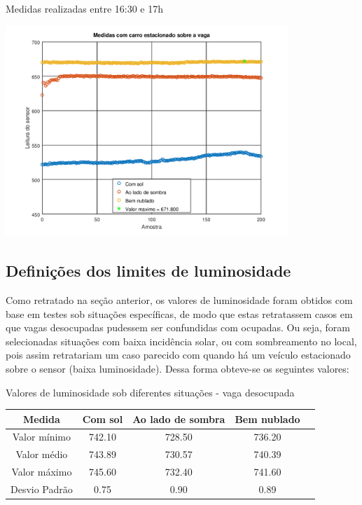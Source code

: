 \documentclass[oneside,openright,12pt]{ufsm_2015} %
\begin{document}
\begin{enumerate}
        \begin{grafico}[ht]
         	    \caption{\label{exepretex1}Medidas realizadas entre 16:30 e 17h}
    	    \centering
    	    \includegraphics[width=0.8\textwidth]{figuras/carros_tarde.png}
    	    \vspace{\baselineskip} %
                \label{graph:medidas-vaga-ocupada-tarde}
        \end{grafico}
        
    \end{enumerate}
    
    \subsection{Definições dos limites de luminosidade}
    Como retratado na seção anterior, os valores de luminosidade foram obtidos com base em testes sob situações específicas, de modo que estas retratassem casos em que vagas desocupadas pudessem ser confundidas com ocupadas. Ou seja, foram selecionadas situações com baixa incidência solar, ou com sombreamento no local, pois assim retratariam um caso parecido com quando há um veículo estacionado sobre o sensor (baixa luminosidade). Dessa forma obteve-se os seguintes valores:
    
    \begin{quadro}\label{quadro:valores-vaga-desocupada}
   	    \caption{Valores de luminosidade sob diferentes situações - vaga desocupada}
	    \centering
	    \begin{tabular}{| c | c |c |c |c |}
	    \hline
	    Medida & Com sol & Ao lado de sombra & Bem nublado\\
	    \hline
	    Valor mínimo & 742.10 & 728.50 & 736.20\\
	    \hline
	    Valor médio & 743.89 & 730.57 & 740.39\\
	    \hline
	    Valor máximo & 745.60 & 732.40 & 741.60\\
	    \hline
	    Desvio Padrão & 0.75 & 0.90 & 0.89\\
	    \hline
	    \end{tabular}
	    \vspace{\baselineskip} %
    \end{quadro}
    
\end{document}
